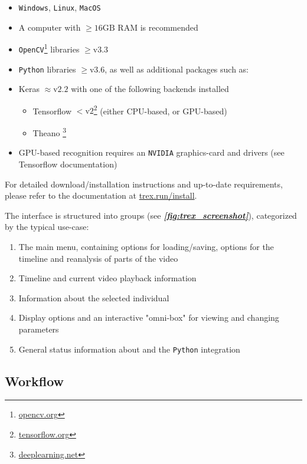 \documentclass[9pt,lineno]{elife}
\newcommand{\figref}[1]{\textit{\textbf{\ref{#1}}}}
\newcommand{\TRex}{\protect\path{TRex}}
\begin{document}
\begin{appendixbox}
\begin{itemize}
    \item \texttt{Windows}, \texttt{Linux}, \texttt{MacOS}
    \item A computer with $\geq 16\mathrm{GB}$ RAM is recommended
    \item \texttt{OpenCV}\footnote{\href{https://opencv.org}{opencv.org}} libraries $\ge \mathrm{v}3.3$
    \item \texttt{Python} libraries $\ge \mathrm{v}3.6$, as well as additional packages such as:
    \item Keras $\approx \mathrm{v}2.2$ with one of the following backends installed
    \begin{itemize}
        \item Tensorflow $<\mathrm{v}2$\footnote{\href{https://tensorflow.org}{tensorflow.org}} (either CPU-based, or GPU-based)
        \item Theano \footnote{\href{http://deeplearning.net/software/theano/}{deeplearning.net}}
    \end{itemize}
    \item GPU-based recognition requires an \texttt{NVIDIA} graphics-card and drivers (see Tensorflow documentation)
    
\end{itemize}

For detailed download/installation instructions and up-to-date requirements, please refer to the documentation at \href{https://trex.run/install}{trex.run/install}.

The interface is structured into groups (see \figref{fig:trex_screenshot}), categorized by the typical use-case:

\begin{enumerate}
    \item The main menu, containing options for loading/saving, options for the timeline and reanalysis of parts of the video
    \item Timeline and current video playback information
    \item Information about the selected individual
    \item Display options and an interactive "omni-box" for viewing and changing parameters
    \item General status information about \TRex{} and the \texttt{Python} integration
\end{enumerate}

\subsection{Workflow}


\end{appendixbox}
\end{document}
